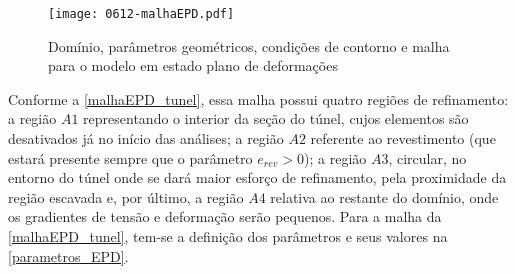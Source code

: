 \begin{figure}[H]
	\begin{center}
		\texttt{[image: 0612-malhaEPD.pdf]}
	\end{center}
	\caption{\label{malhaEPD_tunel}Domínio, parâmetros geométricos, condições de contorno e malha para o modelo em estado plano de deformações}
\end{figure}

Conforme a \autoref{malhaEPD_tunel}, essa malha possui quatro regiões de refinamento: a região $A1$ representando o interior da seção do túnel, cujos elementos são desativados já no início das análises; a região $A2$ referente ao revestimento (que estará presente sempre que o parâmetro  $e_{rev} > 0$); a região $A3$, circular, no entorno do túnel onde se dará maior esforço de refinamento, pela proximidade da região escavada e, por último, a região $A4$ relativa ao restante do domínio, onde os gradientes de tensão e deformação serão pequenos. Para a malha da \autoref{malhaEPD_tunel}, tem-se a definição dos parâmetros e seus valores na \autoref{parametros_EPD}.

